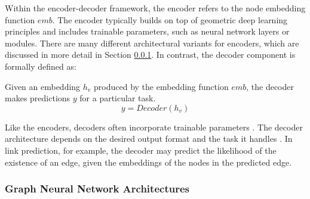 
Within the encoder-decoder framework, the encoder refers to the node embedding function $emb$. The encoder typically builds on top of geometric deep learning principles and includes trainable parameters, such as neural network layers or modules. There are many different architectural variants for encoders, which are discussed in more detail in Section \ref{s_Background_GNNs_GNNArchtectures}. In contrast, the decoder component is formally defined as:

\begin{definition}
    \label{d_Decoder}
    Given an embedding $h_v$ produced by the embedding function $emb$, the decoder makes predictions $y$ for a particular task.
    \begin{equation}
        y = Decoder(h_v)
    \end{equation}
\end{definition}

Like the encoders, decoders often incorporate trainable parameters \cite{hamilton_representation_2017}. The decoder architecture depends on the desired output format and the task it handles \cite{hamilton_representation_2017}. In link prediction, for example, the decoder may predict the likelihood of the existence of an edge, given the embeddings of the nodes in the predicted edge.

\subsubsection{Graph Neural Network Architectures}
\label{s_Background_GNNs_GNNArchtectures}

